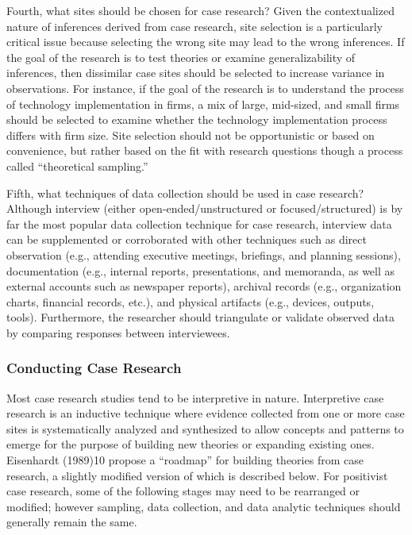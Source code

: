 Fourth, what sites should be chosen for case research? Given the contextualized nature of inferences derived from case research, site selection is a particularly critical issue because selecting the wrong site may lead to the wrong inferences. If the goal of the research is to test theories or examine generalizability of inferences, then dissimilar case sites should be selected to increase variance in observations. For instance, if the goal of the research is to understand the process of technology implementation in firms, a mix of large, mid-sized, and small firms should be selected to examine whether the technology implementation process differs with firm size. Site selection should not be opportunistic or based on convenience, but rather based on the fit with research questions though a process called “theoretical sampling.”

Fifth, what techniques of data collection should be used in case research? Although interview (either open-ended/unstructured or focused/structured) is by far the most popular data collection technique for case research, interview data can be supplemented or corroborated with other techniques such as direct observation (e.g., attending executive meetings, briefings, and planning sessions), documentation (e.g., internal reports, presentations, and memoranda, as well as external accounts such as newspaper reports), archival records (e.g., organization charts, financial records, etc.), and physical artifacts (e.g., devices, outputs, tools). Furthermore, the researcher should triangulate or validate observed data by comparing responses between interviewees.

\subsubsection{Conducting Case Research}

Most case research studies tend to be interpretive in nature. Interpretive case research is an inductive technique where evidence collected from one or more case sites is systematically analyzed and synthesized to allow concepts and patterns to emerge for the purpose of building new theories or expanding existing ones. Eisenhardt (1989)10 propose a “roadmap” for building theories from case research, a slightly modified version of which is described below. For positivist case research, some of the following stages may need to be rearranged or modified; however sampling, data collection, and data analytic techniques should generally remain the same.


